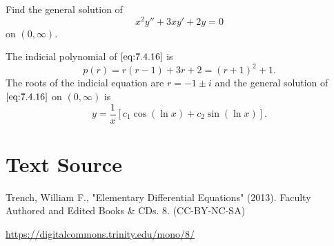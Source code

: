 \documentclass{ximera}
\begin{document}
\begin{example}\label{example:7.4.7}
  Find the general solution of
\begin{equation} \label{eq:7.4.16}
x^2y''+3xy'+2y=0
\end{equation}
on  $(0,\infty)$.
\begin{explanation}
The indicial polynomial of $\eqref{eq:7.4.16}$ is
$$
p(r)=r(r-1)+3r+2=(r+1)^2+1.
$$
The roots of the indicial equation are $r=-1 \pm i$ and the general
solution of $\eqref{eq:7.4.16}$ on $(0,\infty)$ is
$$
y=\frac{1}{x}\left[c_1\cos(\ln x)+c_2\sin(\ln x)\right].
$$
\end{explanation}
\end{example}

\section*{Text Source}
Trench, William F., "Elementary Differential Equations" (2013). Faculty Authored and Edited Books \& CDs. 8. (CC-BY-NC-SA)

\href{https://digitalcommons.trinity.edu/mono/8/}{https://digitalcommons.trinity.edu/mono/8/}
\end{document}
